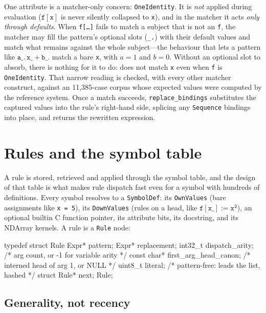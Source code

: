 One attribute is a matcher-only concern: \texttt{OneIdentity}. It is \emph{not}
applied during evaluation (\(\mathtt{f[x]}\) is never silently collapsed to
\texttt{x}), and in the matcher it acts \emph{only through defaults}. When
\texttt{f[\dots]} fails to match a subject that is not an \texttt{f}, the matcher may
fill the pattern's optional slots (\texttt{\_.}) with their default values and match
what remains against the whole subject---the behaviour that lets a pattern like
\(\mathtt{a\_.\, x\_ + b\_.}\) match a bare \texttt{x}, with \(a=1\) and \(b=0\).
Without an optional slot to absorb, there is nothing for it to do:
 does not match \texttt{x} even when \texttt{f} is \texttt{OneIdentity}.
That narrow reading is checked, with every other matcher construct, against an
11{,}385-case corpus whose expected values were computed by the reference system.
 Once a match succeeds, \texttt{replace\_bindings} substitutes the captured
values into the rule's right-hand side, splicing any \texttt{Sequence} bindings into
place, and returns the rewritten expression.

\section{Rules and the symbol table}
\label{sec:int-symtab}

A rule is stored, retrieved and applied through the symbol table, and the design of
that table is what makes rule dispatch fast even for a symbol with hundreds of
definitions. Every symbol resolves to a \texttt{SymbolDef}: its \texttt{OwnValues}
(bare assignments like \texttt{x = 5}), its \texttt{DownValues} (rules on a head, like
\(\mathtt{f[x\_] := x^2}\)), an optional builtin C function pointer, its attribute
bits, its docstring, and its NDArray kernels. A rule is a \texttt{Rule} node:

\begin{ccode}
typedef struct Rule {
    Expr* pattern;
    Expr* replacement;
    int32_t     dispatch_arity;        /* arg count, or -1 for variable arity   */
    const char* first_arg_head_canon;  /* interned head of arg 1, or NULL        */
    uint8_t     literal;               /* pattern-free: leads the list, hashed  */
    struct Rule* next;
} Rule;
\end{ccode}

\subsection*{Generality, not recency}

